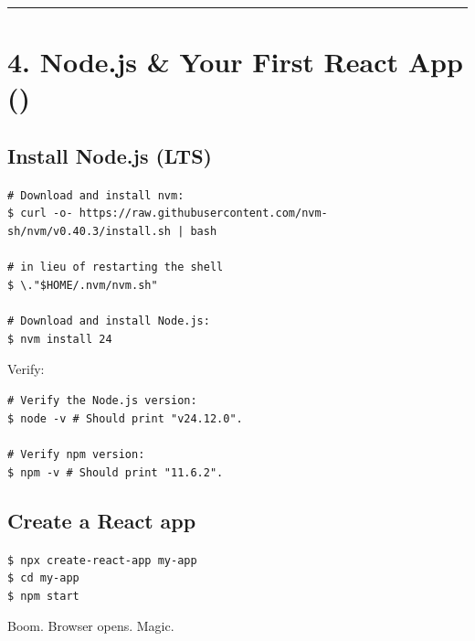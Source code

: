 \documentclass[12pt]{article}
\newcommand{\reacticon}{\faReact}
\begin{document}
\vspace{1em}
\begin{center}
\color{teamred}\rule{0.8\textwidth}{1pt}
\end{center}

\section*{4. Node.js \& Your First React App (\reacticon)}

\subsection*{Install Node.js (LTS)}

\begin{highlightbox}
\texttt{\# Download and install nvm:}\\
\texttt{\$ curl -o- https://raw.githubusercontent.com/nvm-sh/nvm/v0.40.3/install.sh | bash}\\
\\
\texttt{\# in lieu of restarting the shell}\\
\texttt{\$ \textbackslash."\$HOME/.nvm/nvm.sh"}\\
\\
\texttt{\# Download and install Node.js:}\\
\texttt{\$ nvm install 24}
\end{highlightbox}

Verify:

\begin{highlightbox}
\texttt{\# Verify the Node.js version:}\\
\texttt{\$ node -v \# Should print "v24.12.0".}\\
\\
\texttt{\# Verify npm version:}\\
\texttt{\$ npm -v \# Should print "11.6.2".}
\end{highlightbox}

\subsection*{Create a React app}

\begin{highlightbox}
\texttt{\$ npx create-react-app my-app}\\
\texttt{\$ cd my-app}\\
\texttt{\$ npm start}
\end{highlightbox}

Boom. Browser opens. Magic.
\end{document}
